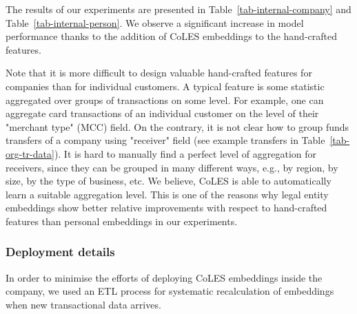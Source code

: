 \documentclass[sigconf, anonymous]{acmart}
\begin{document}
The results of our experiments are presented in Table~\ref{tab-internal-company} and Table~\ref{tab-internal-person}. We observe a significant increase in model performance thanks to the addition of CoLES embeddings to the hand-crafted features.

Note that it is more difficult to design valuable hand-crafted features for companies than for individual customers. A typical feature is some statistic aggregated over groups of transactions on some level. For example, one can aggregate card transactions of an individual customer on the level of their "merchant type" (MCC) field. On the contrary, it is not clear how to group funds transfers of a company using "receiver" field (see example transfers in Table~\ref{tab-org-tr-data}). It is hard to manually find a perfect level of aggregation for receivers, since they can be grouped in many different ways, e.g., by region, by size, by the type of business, etc. We believe, CoLES is able to automatically learn a suitable aggregation level. This is one of the reasons why legal entity embeddings show better relative improvements with respect to hand-crafted features than personal embeddings in our experiments.

\subsubsection{Deployment details} \label{sec-deployment}


In order to minimise the efforts of deploying CoLES embeddings inside the company, we used an ETL process for systematic recalculation of embeddings when new transactional data arrives.
\end{document}
